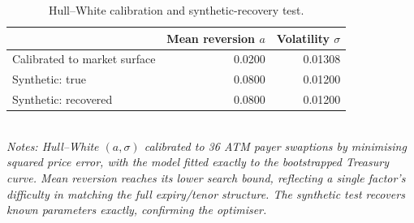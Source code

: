 \begin{table}[t]
\centering
\caption{Hull--White calibration and synthetic-recovery test.}
\label{tab:hw}
\small
\begin{tabular}{lrr}
\toprule
& Mean reversion $a$ & Volatility $\sigma$ \\
\midrule
Calibrated to market surface & 0.0200 & 0.01308 \\
\midrule
Synthetic: true & 0.0800 & 0.01200 \\
Synthetic: recovered & 0.0800 & 0.01200 \\
\bottomrule
\end{tabular}
\\[2pt]{\footnotesize\itshape Notes: Hull--White $(a,\sigma)$ calibrated to 36 ATM payer swaptions by minimising squared price error, with the model fitted exactly to the bootstrapped Treasury curve. Mean reversion reaches its lower search bound, reflecting a single factor's difficulty in matching the full expiry/tenor structure. The synthetic test recovers known parameters exactly, confirming the optimiser.}
\end{table}